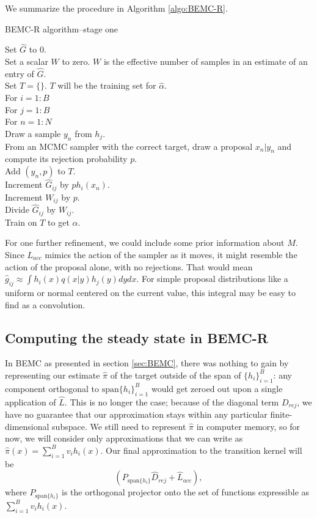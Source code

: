 \documentclass{article}
\newcommand\EMK[1]{\textcolor{purple}{EMK: #1}}
\begin{document}
We summarize the procedure in Algorithm \ref{algo:BEMC-R}.

\begin{algorithm}[h]
\caption{BEMC-R algorithm--stage one \label{algo:BEMC-R}}
Set $\hat{G}$ to $0$.\\ 
Set a scalar $W$ to zero. $W$ is the effective number of samples in an estimate of an entry of $\hat{G}$.\\
Set $T = \{\}$. $T$ will be the training set for $\hat{\alpha}$.\\
For $i  = 1:B$\\
\Indp
For $j = 1:B$\\
\Indp
For $n = 1:N$\\
\Indp
Draw a sample $y_n$ from $h_{j}$.\\
From an MCMC sampler with the correct target, draw a proposal $x_n|y_n$ and compute its rejection probability $p$.\\
Add $(y_n, p)$ to $T$.\\
Increment $\hat{G}_{ij}$ by $ph_{i}(x_n)$.\\
Increment $W_{ij}$ by $p$.\\
\Indm
Divide $\hat{G}_{ij}$ by $W_{ij}$.\\
\Indm
\Indm
Train on $T$ to get $\hat{\alpha}$.%
\end{algorithm}

For one further refinement, we could include some prior information about $M$. Since $L_{acc}$ mimics the action of the sampler as it moves, it might resemble the action of the proposal alone, with no rejections. That would mean $\hat{g}_{ij} \approx \int h_i(x)q(x|y)h_j(y)dydx$. For simple proposal distributions like a uniform or normal centered on the current value, this integral may be easy to find as a convolution.

\subsection{Computing the steady state in BEMC-R}
\label{BEMC-R-target}


In BEMC as presented in section \ref{sec:BEMC}, there was nothing to gain by representing our estimate $\hat{\pi}$ of the target outside of the span of $\{h_i\}_{i=1}^B$: any component orthogonal to $\text{span}\{h_i\}_{i=1}^B$ would get zeroed out upon a single application of $\hat{L}$. This is no longer the case; because of the diagonal term $D_{rej}$, we have no guarantee that our approximation stays within any particular finite-dimensional subspace. We still need to represent $\hat{\pi}$ in computer memory, so for now, we will %
consider only approximations that we can write as $\hat{\pi}(x) = \sum_{i=1}^{B}v_{i}h_i(x)$. Our final approximation to the transition kernel will be $$ (P_{\text{span}\{h_i\}}\hat{D}_{rej} + 
\hat{L}_{acc}),$$ where $P_{\text{span}\{h_i\}}$ is the orthogonal projector onto the set of functions expressible as $\sum_{i=1}^{B}v_{i}h_i(x)$.
\end{document}
